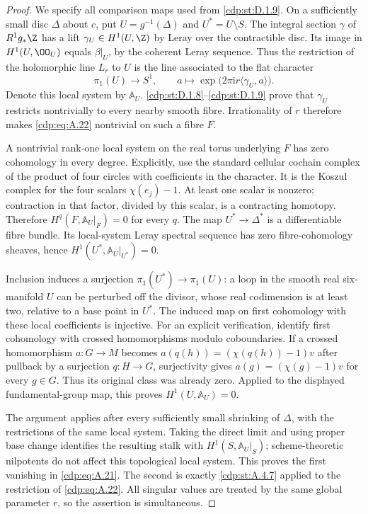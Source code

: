 \begin{proof}
We specify all comparison maps used from \ref{cdp:st:D.1.9}. On a sufficiently small disc $\Delta$ about $c$, put $U=g^{-1}(\Delta)$ and $U^*=U\setminus S$. The integral section $\gamma$ of $R^1g_*\Z$ has a lift $\gamma_U\in H^1(U,\Z)$ by Leray over the contractible disc. Its image in $H^1(U,\OO_U)$ equals $\beta|_U$, by the coherent Leray sequence. Thus the restriction of the holomorphic line $L_r$ to $U$ is the line associated to the flat character
\[
 \pi_1(U)\longrightarrow S^1,\qquad
 a\longmapsto\exp\bigl(2\pi\mathrm i r\langle\gamma_U,a\rangle\bigr).
 \tag{A.22}\label{cdp:eq:A.22}
\]
Denote this local system by $\mathbb A_U$. \ref{cdp:st:D.1.8}--\ref{cdp:st:D.1.9} prove that $\gamma_U$ restricts nontrivially to every nearby smooth fibre. Irrationality of $r$ therefore makes \eqref{cdp:eq:A.22} nontrivial on such a fibre $F$.

A nontrivial rank-one local system on the real torus underlying $F$ has zero cohomology in every degree. Explicitly, use the standard cellular cochain complex of the product of four circles with coefficients in the character. It is the Koszul complex for the four scalars $\chi(e_j)-1$. At least one scalar is nonzero; contraction in that factor, divided by this scalar, is a contracting homotopy. Therefore $H^q(F,\mathbb A_U|_F)=0$ for every $q$. The map $U^*\to\Delta^*$ is a differentiable fibre bundle. Its local-system Leray spectral sequence has zero fibre-cohomology sheaves, hence
$H^1(U^*,\mathbb A_U|_{U^*})=0$.

Inclusion induces a surjection $\pi_1(U^*)\to\pi_1(U)$: a loop in the smooth real six-manifold $U$ can be perturbed off the divisor, whose real codimension is at least two, relative to a base point in $U^*$. The induced map on first cohomology with these local coefficients is injective. For an explicit verification, identify first cohomology with crossed homomorphisms modulo coboundaries. If a crossed homomorphism $a:G\to M$ becomes $a(q(h))=(\chi(q(h))-1)v$ after pullback by a surjection $q:H\to G$, surjectivity gives $a(g)=(\chi(g)-1)v$ for every $g\in G$. Thus its original class was already zero. Applied to the displayed fundamental-group map, this proves $H^1(U,\mathbb A_U)=0$.

The argument applies after every sufficiently small shrinking of $\Delta$, with the restrictions of the same local system. Taking the direct limit and using proper base change identifies the resulting stalk with $H^1(S,\mathbb A_U|_S)$; scheme-theoretic nilpotents do not affect this topological local system. This proves the first vanishing in \eqref{cdp:eq:A.21}. The second is exactly \ref{cdp:st:A.4.7} applied to the restriction of \eqref{cdp:eq:A.22}. All singular values are treated by the same global parameter $r$, so the assertion is simultaneous.
\end{proof}


